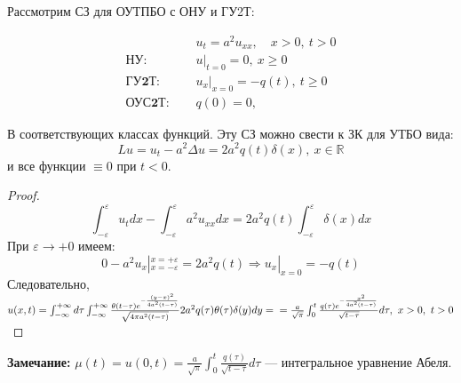 Рассмотрим СЗ для ОУТПБО с ОНУ и ГУ2Т:

\begin{align*}
	& u_{t} = a^2 u_{xx}, \quad x > 0,\ t > 0 \tag{1.0}    \\
	\textbf{НУ: } \quad    & u|_{t=0}=0,\ x \ge 0 \tag{2.0} \\
	\textbf{ГУ2Т: } \quad & u_x|_{x=0} = -q(t),\ t \ge 0 \tag{3.2}                      \\
	\textbf{ОУС2Т: } \quad    &  q(0)=0, \tag{4.2.0}
\end{align*}

В соответствующих классах функций. Эту СЗ можно свести к ЗК для УТБО вида:
\[
	Lu = u_t - a^2 \Delta u = 2a^2q(t)\delta(x),\ x \in \mathbb{R}
\]
и все функции $\equiv 0$ при $t<0$.

\begin{proof}
	\[
		\int_{-\varepsilon}^{\varepsilon} u_{t} dx-
		\int_{-\varepsilon}^{\varepsilon} a^{2}u_{xx} dx = 
		2a^{2}q(t) \int_{-\varepsilon}^{\varepsilon} \delta(x) dx
	\]
	При $\varepsilon \rightarrow +0$ имеем:
	\[
		0 - a^{2}u_x|_{x=-\varepsilon}^{x=+\varepsilon}=
		2a^{2}q(t) \Rightarrow u_x|_{x=0} = -q(t)
	\]
	Следовательно, $u(x, t) = 
	\int_{-\infty}^{+\infty}d\tau
	\int_{-\infty}^{+\infty}
	\frac{\theta(t-\tau)e^{-\frac{(y-x)^2}{4a^{2}(t-\tau)}}}
	{\sqrt{4\pi a^2(t-\tau)}}2a^2q(\tau) \theta(\tau) \delta(y) dy =\\ =\frac{a}{\sqrt{\pi}} \int_0^t \frac{q(\tau) e^{-\frac{x^2}{4a^2(t-\tau)}}}{\sqrt{t-\tau}} d\tau,\ x>0,\ t>0$
\end{proof}

\textbf{Замечание:} $\mu(t) = u(0, t) = \frac{a}{\sqrt{\pi}} \int_0^t \frac{q(\tau)}{\sqrt{t-\tau}} d\tau$ --- интегральное уравнение Абеля.